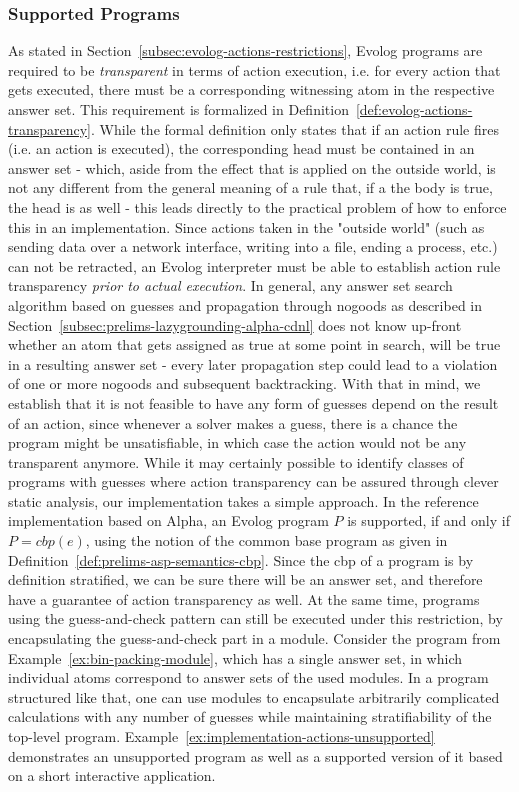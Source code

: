 \subsubsection{Supported Programs}
\label{subsubsec:implementation-actions-support}
As stated in Section~\ref{subsec:evolog-actions-restrictions}, Evolog programs are required to be \emph{transparent} in terms of action execution, i.e. for every action that gets executed, there must be a corresponding witnessing atom in the respective answer set. This requirement is formalized in Definition~\ref{def:evolog-actions-transparency}. While the formal definition only states that if an action rule fires (i.e. an action is executed), the corresponding head must be contained in an answer set - which, aside from the effect that is applied on the outside world, is not any different from the general meaning of a rule that, if a the body is true, the head is as well - this leads directly to the practical problem of how to enforce this in an implementation. Since actions taken in the "outside world" (such as sending data over a network interface, writing into a file, ending a process, etc.) can not be retracted, an Evolog interpreter must be able to establish action rule transparency \emph{prior to actual execution}. In general, any answer set search algorithm based on guesses and propagation through nogoods as described in Section~\ref{subsec:prelims-lazygrounding-alpha-cdnl} does not know up-front whether an atom that gets assigned as true at some point in search, will be true in a resulting answer set - every later propagation step could lead to a violation of one or more nogoods and subsequent backtracking. With that in mind, we establish that it is not feasible to have any form of guesses depend on the result of an action, since whenever a solver makes a guess, there is a chance the program might be unsatisfiable, in which case the action would not be any transparent anymore. While it may certainly possible to identify classes of programs with guesses where action transparency can be assured through clever static analysis, our implementation takes a simple approach. In the reference implementation based on Alpha, an Evolog program $P$ is supported, if and only if $P = cbp(e)$, using the notion of the common base program as given in Definition~\ref{def:prelims-asp-semantics-cbp}. Since the \gls{cbp} of a program is by definition stratified, we can be sure there will be an answer set, and therefore have a guarantee of action transparency as well. At the same time, programs using the guess-and-check pattern can still be executed under this restriction, by encapsulating the guess-and-check part in a module. Consider the program from Example~\ref{ex:bin-packing-module}, which has a single answer set, in which individual atoms correspond to answer sets of the used modules. In a program structured like that, one can use modules to encapsulate arbitrarily complicated calculations with any number of guesses while maintaining stratifiability of the top-level program.
Example~\ref{ex:implementation-actions-unsupported} demonstrates an unsupported program as well as a supported version of it based on a short interactive application.

